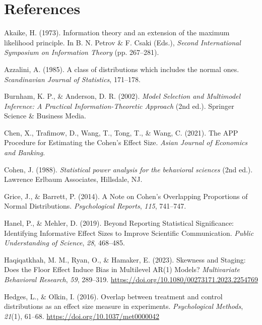 \documentclass[
  12pt,
  a4paper,
  DIV=11,
  numbers=noendperiod]{scrartcl}
\newlength{\cslhangindent}
\newenvironment{CSLReferences}[2] %
 {\begin{list}{}{%
  \setlength{\itemindent}{0pt}
  \setlength{\leftmargin}{0pt}
  \setlength{\parsep}{0pt}
  \ifodd #1
   \setlength{\leftmargin}{\cslhangindent}
   \setlength{\itemindent}{-1\cslhangindent}
  \fi
  \setlength{\itemsep}{#2\baselineskip}}}
 {\end{list}}
\begin{document}
\section{References}\label{references}

\label{refs}
\begin{CSLReferences}{1}{0}
Akaike, H. (1973). {Information theory and an extension of the maximum
likelihood principle}. In B. N. Petrov \& F. Csaki (Eds.), \emph{{Second
International Symposium on Information Theory}} (pp. 267--281).

Azzalini, A. (1985). A class of distributions which includes the normal
ones. \emph{Scandinavian Journal of Statistics}, 171--178.

Burnham, K. P., \& Anderson, D. R. (2002). \emph{{Model {S}election and
{M}ultimodel {I}nference: {A} {P}ractical {I}nformation-{T}heoretic
{A}pproach}} (2nd ed.). Springer Science \& Business Media.

Chen, X., Trafimow, D., Wang, T., Tong, T., \& Wang, C. (2021). {The APP
Procedure for Estimating the Cohen's Effect Size}. \emph{Asian Journal
of Economics and Banking}.

Cohen, J. (1988). \emph{{Statistical power analysis for the behavioral
sciences}} (2nd ed.). Lawrence Erlbaum Associates, Hillsdale, NJ.

Grice, J., \& Barrett, P. (2014). {A Note on Cohen's Overlapping
Proportions of Normal Distributions}. \emph{Psychological Reports},
\emph{115}, 741--747.

Hanel, P., \& Mehler, D. (2019). {Beyond Reporting Statistical
Significance: Identifying Informative Effect Sizes to Improve Scientific
Communication}. \emph{Public Understanding of Science}, \emph{28},
468--485.

Haqiqatkhah, M. M., Ryan, O., \& Hamaker, E. (2023). {Skewness and
Staging: Does the Floor Effect Induce Bias in Multilevel AR(1) Models?}
\emph{Multivariate Behavioral Research}, \emph{59}, 289--319.
\url{https://doi.org/10.1080/00273171.2023.2254769}

Hedges, L., \& Olkin, I. (2016). {Overlap between treatment and control
distributions as an effect size measure in experiments}.
\emph{Psychological Methods}, \emph{21}(1), 61--68.
\url{https://doi.org/10.1037/met0000042}


\end{CSLReferences}
\end{document}
